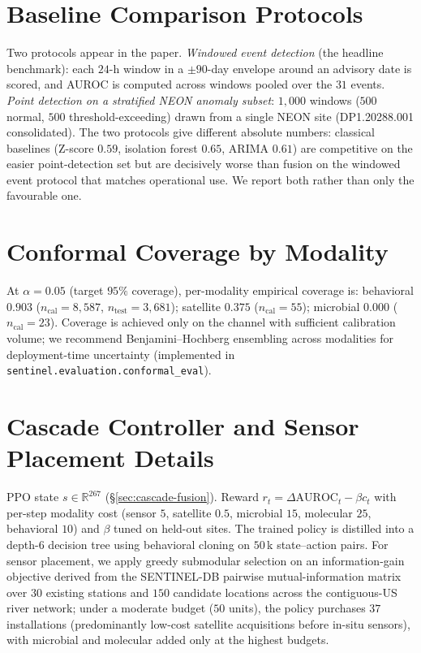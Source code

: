 \documentclass{article}
\begin{document}
\section{Baseline Comparison Protocols}
\label{app:baselines}
Two protocols appear in the paper. \emph{Windowed event detection} (the headline benchmark): each $24$-h window in a $\pm 90$-day envelope around an advisory date is scored, and AUROC is computed across windows pooled over the $31$ events. \emph{Point detection on a stratified NEON anomaly subset}: $1{,}000$ windows ($500$ normal, $500$ threshold-exceeding) drawn from a single NEON site (DP1.20288.001 consolidated). The two protocols give different absolute numbers: classical baselines (Z-score $0.59$, isolation forest $0.65$, ARIMA $0.61$) are competitive on the easier point-detection set but are decisively worse than fusion on the windowed event protocol that matches operational use. We report both rather than only the favourable one.

\section{Conformal Coverage by Modality}
\label{app:conformal}
At $\alpha\!=\!0.05$ (target $95\%$ coverage), per-modality empirical coverage is: behavioral $0.903$ ($n_\text{cal}\!=\!8{,}587$, $n_\text{test}\!=\!3{,}681$); satellite $0.375$ ($n_\text{cal}\!=\!55$); microbial $0.000$ ($n_\text{cal}\!=\!23$). Coverage is achieved only on the channel with sufficient calibration volume; we recommend Benjamini--Hochberg ensembling across modalities for deployment-time uncertainty (implemented in \texttt{sentinel.evaluation.conformal\_eval}).

\section{Cascade Controller and Sensor Placement Details}
\label{app:cascade}
PPO state $s\!\in\!\mathbb{R}^{267}$ (\S\ref{sec:cascade-fusion}). Reward $r_t\!=\!\Delta\mathrm{AUROC}_t-\beta c_t$ with per-step modality cost (sensor $5$, satellite $0.5$, microbial $15$, molecular $25$, behavioral $10$) and $\beta$ tuned on held-out sites. The trained policy is distilled into a depth-$6$ decision tree using behavioral cloning on $50$\,k state--action pairs. For sensor placement, we apply greedy submodular selection on an information-gain objective derived from the SENTINEL-DB pairwise mutual-information matrix over $30$ existing stations and $150$ candidate locations across the contiguous-US river network; under a moderate budget ($50$ units), the policy purchases $37$ installations (predominantly low-cost satellite acquisitions before in-situ sensors), with microbial and molecular added only at the highest budgets.
\end{document}
